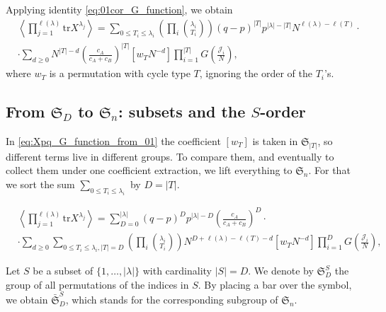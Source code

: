 \documentclass{article}
\newcommand{\tr}{\mathrm{tr}}
\theoremstyle{plain}
\theoremstyle{definition}
\numberwithin{equation}{section}
\begin{document}
Applying identity \eqref{eq:01cor_G_function}, we obtain
\begin{equation}
    \label{eq:Xpq_G_function_from_01}
    \begin{aligned}
        & \left\langle \prod_{j=1}^{\ell(\lambda)} \tr X^{\lambda_{j}} \right\rangle = \sum_{0 \le T_{i} \le \lambda_{i}} \left(\prod_{i} \binom{\lambda_{i}}{T_{i}} \right) (q-p)^{|T|} p^{|\lambda|-|T|} N^{\ell(\lambda) - \ell(T)} \cdot \\
        & \cdot \sum\limits_{d\ge 0} N^{|T|-d} \left(\frac{c_{A}}{c_{A}+c_{B}}\right)^{|T|} [w_{T} N^{-d}] \prod_{i=1}^{|T|} G\left(\frac{\mathcal{J}_{i}}{N} \right),
    \end{aligned}
\end{equation}
where $w_T$ is a permutation with cycle type $T$, ignoring the order of the $T_i$'s.

\subsection{From $\mathfrak{S}_D$ to $\mathfrak{S}_n$: subsets and the $S$-order}
\label{subs:lifting}

In \eqref{eq:Xpq_G_function_from_01} the coefficient $[w_T]$ is taken in
$\mathfrak{S}_{|T|}$, so different terms live in different groups. To compare
them, and eventually to collect them under one coefficient extraction, we lift
everything to $\mathfrak{S}_n$. For that we sort the sum
$\sum_{0 \le T_i \le \lambda_i}$ by $D=|T|$.

\begin{equation}
    \label{eq:Xpq_D_intro}
    \begin{aligned}
        & \left\langle \prod_{j=1}^{\ell(\lambda)} \tr X^{\lambda_{j}} \right\rangle = \sum_{D=0}^{|\lambda|} (q-p)^{D} p^{|\lambda|-D} \left(\frac{c_{A}}{c_{A}+c_{B}}\right)^{D} \cdot \\
        & \cdot \sum\limits_{d\ge 0} \sum_{0 \le T_{i} \le \lambda_{i}, |T| = D} \left(\prod_{i} \binom{\lambda_{i}}{T_{i}} \right)  N^{D+\ell(\lambda) - \ell(T)-d} [w_{T} N^{-d}] \prod_{i=1}^{D} G\left(\frac{\mathcal{J}_{i}}{N} \right),
    \end{aligned}
\end{equation}

Let $S$ be a subset of $\{1,\dots,|\lambda|\}$ with cardinality $|S| = D$. We denote by $\mathfrak{S}_D^S$ the group of all permutations of the indices in $S$. By placing a bar over the symbol, we obtain $\bar{\mathfrak{S}}_D^S$, which stands for the corresponding subgroup of $\mathfrak{S}_n$.
\end{document}
